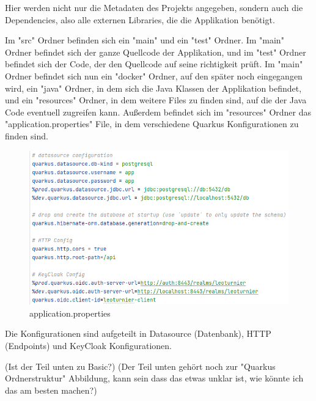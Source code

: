 Hier werden nicht nur die Metadaten des Projekts angegeben, sondern auch die Dependencies, also alle externen Libraries, die die Applikation benötigt. 

Im "src" Ordner befinden sich ein "main" und ein "test" Ordner. Im "main" Ordner befindet sich der ganze Quellcode der Applikation, und im "test" Ordner befindet sich der Code, der den Quellcode auf seine richtigkeit prüft.
Im "main" Ordner befindet sich nun ein "docker" Ordner, auf den später noch eingegangen wird, ein "java" Ordner, in dem sich die Java Klassen der Applikation befindet, und ein "resources" Ordner, in dem weitere Files zu finden sind, 
auf die der Java Code eventuell zugreifen kann. Außerdem befindet sich im "resources" Ordner das "application.properties" File, in dem verschiedene Quarkus Konfigurationen zu finden sind.

\begin{figure}[H]
    \includegraphics[scale=0.6]{pics/backend/application.properties.png}
    \caption{application.properties}
\end{figure}

Die Konfigurationen sind aufgeteilt in Datasource (Datenbank), HTTP (Endpoints) und KeyCloak Konfigurationen. 

(Ist der Teil unten zu Basic?) (Der Teil unten gehört noch zur "Quarkus Ordnerstruktur" Abbildung, kann sein dass das etwas unklar ist, wie könnte ich das am besten machen?)

